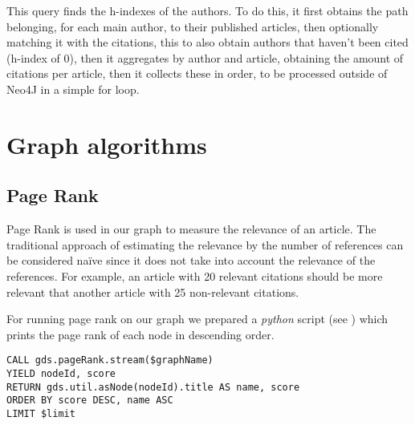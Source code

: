\documentclass[11pt, a4paper]{article}
\begin{document}
This query finds  the  h-indexes  of  the  authors. To do this, it first obtains the path belonging, for each main author, to their published articles, then optionally matching it with the citations, this to also obtain authors that haven't been cited (h-index of 0), then it aggregates by author and article, obtaining the amount of citations per article, then it collects these in order, to be processed outside of Neo4J in a simple for loop.

\section{Graph algorithms}%
\label{sec:graph_algorithms}

\subsection{Page Rank}%
\label{sub:page_rank}




Page Rank is used in our graph to measure the relevance of an article. The traditional approach of estimating the relevance by the number of references can be considered na\"ive since it does not take into account the relevance of the references. For example, an article with 20 relevant citations should be more relevant that another article with 25 non-relevant citations.

For running page rank on our graph we prepared a \textit{python} script (see ) which prints the page rank of each node in descending order.

\begin{lstlisting}[basicstyle=\tiny,breaklines=false]
CALL gds.pageRank.stream($graphName)
YIELD nodeId, score
RETURN gds.util.asNode(nodeId).title AS name, score
ORDER BY score DESC, name ASC
LIMIT $limit
\end{lstlisting}
\end{document}

